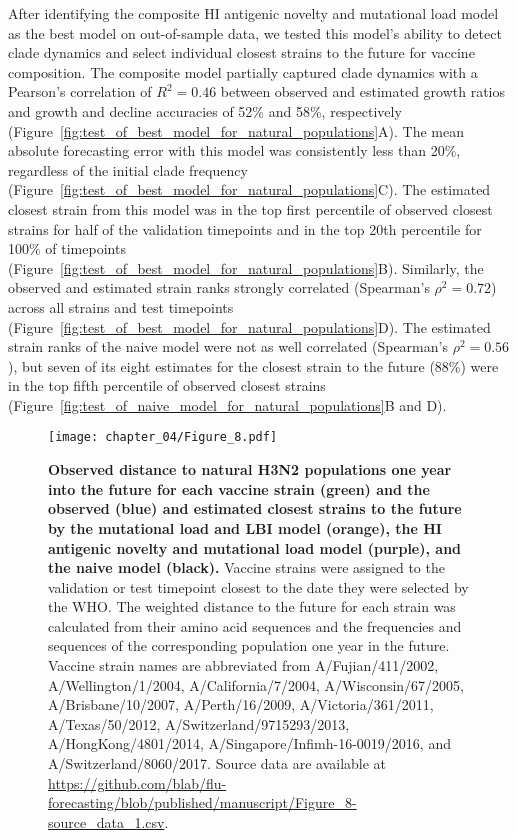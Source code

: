 After identifying the composite HI antigenic novelty and mutational load model as the best model on out-of-sample data, we tested this model's ability to detect clade dynamics and select individual closest strains to the future for vaccine composition.
The composite model partially captured clade dynamics with a Pearson's correlation of $R^2 = 0.46$ between observed and estimated growth ratios and growth and decline accuracies of 52\% and 58\%, respectively (Figure~\ref{fig:test_of_best_model_for_natural_populations}A).
The mean absolute forecasting error with this model was consistently less than 20\%, regardless of the initial clade frequency (Figure~\ref{fig:test_of_best_model_for_natural_populations}C).
The estimated closest strain from this model was in the top first percentile of observed closest strains for half of the validation timepoints and in the top 20th percentile for 100\% of timepoints (Figure~\ref{fig:test_of_best_model_for_natural_populations}B).
Similarly, the observed and estimated strain ranks strongly correlated (Spearman's $\rho^2 = 0.72$) across all strains and test timepoints (Figure~\ref{fig:test_of_best_model_for_natural_populations}D).
The estimated strain ranks of the naive model were not as well correlated (Spearman's $\rho^2 = 0.56$), but seven of its eight estimates for the closest strain to the future (88\%) were in the top fifth percentile of observed closest strains (Figure~\ref{fig:test_of_naive_model_for_natural_populations}B and D).

\begin{figure}
  \texttt{[image: chapter\_04/Figure\_8.pdf]}
  \caption[{Observed distance to natural H3N2 populations one year into the future for each vaccine strain (green) and the observed (blue) and estimated closest strains to the future by the mutational load and LBI model (orange), the HI antigenic novelty and mutational load model (purple), and the naive model (black).}]{
    {\bf Observed distance to natural H3N2 populations one year into the future for each vaccine strain (green) and the observed (blue) and estimated closest strains to the future by the mutational load and LBI model (orange), the HI antigenic novelty and mutational load model (purple), and the naive model (black).}
    Vaccine strains were assigned to the validation or test timepoint closest to the date they were selected by the WHO.
    The weighted distance to the future for each strain was calculated from their amino acid sequences and the frequencies and sequences of the corresponding population one year in the future.
    Vaccine strain names are abbreviated from A/Fujian/411/2002, A/Wellington/1/2004, A/California/7/2004, A/Wisconsin/67/2005, A/Brisbane/10/2007, A/Perth/16/2009, A/Victoria/361/2011, A/Texas/50/2012, A/Switzerland/9715293/2013, A/HongKong/4801/2014, A/Singapore/Infimh-16-0019/2016, and A/Switzerland/8060/2017.
    Source data are available at \url{https://github.com/blab/flu-forecasting/blob/published/manuscript/Figure_8-source_data_1.csv}.
  }
  \label{fig:vaccine_comparison}
\end{figure}

